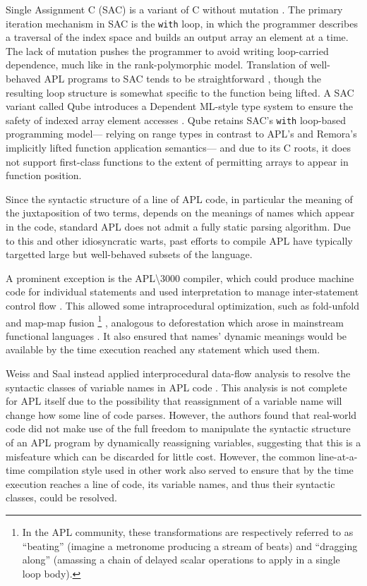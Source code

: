 Single Assignment C (SAC) is a variant of C without mutation \cite{SAC}.
The primary iteration mechanism in SAC is the {\tt with} loop,
in which the programmer describes a traversal of the index space
and builds an output array an element at a time.
The lack of mutation pushes the programmer
to avoid writing loop-carried dependence,
much like in the rank-polymorphic model.
Translation of well-behaved APL programs to SAC
tends to be straightforward \cite{APLSAC},
though the resulting loop structure is
somewhat specific to the function being lifted.
A SAC variant called Qube introduces a Dependent ML-style type system
to ensure the safety of indexed array element accesses \cite{Qube}.
Qube retains SAC's {\tt with} loop-based programming model---%
relying on range types in contrast to
APL's and Remora's implicitly lifted function application semantics---%
and due to its C roots,
it does not support first-class functions
to the extent of permitting arrays to appear in function position.

Since the syntactic structure of a line of APL code,
in particular the meaning of the juxtaposition of two terms,
depends on the meanings of names which appear in the code,
standard APL does not admit a fully static parsing algorithm.
Due to this and other idiosyncratic warts,
past efforts to compile APL have typically targetted
large but well-behaved subsets of the language.

A prominent exception is the APL\textbackslash3000 compiler,
which could produce machine code for individual statements
and used interpretation to manage inter-statement control flow \cite{APL3000Compiler}.
This allowed some intraprocedural optimization,
such as fold-unfold and map-map fusion%
\footnote{In the APL community,
  these transformations are respectively referred to as
``beating'' (imagine a metronome producing a stream of beats)
and ``dragging along'' (amassing a chain of
delayed scalar operations to apply in a single loop body).}
\cite{AbramsAPLMachine},
analogous to deforestation
which arose in mainstream functional languages \cite{BurstallDarlington, WadlerListless}.
It also ensured that names' dynamic meanings would be available
by the time execution reached any statement which used them.

Weiss and Saal instead applied interprocedural data-flow analysis
to resolve the syntactic classes of variable names in APL code \cite{ParsingAPL}.
This analysis is not complete for APL itself
due to the possibility that reassignment of a variable name
will change how some line of code parses.
However, the authors found that
real-world code did not make use of
the full freedom to manipulate
the syntactic structure of an APL program
by dynamically reassigning variables,
suggesting that this is a misfeature which can be discarded for little cost.
However, the common line-at-a-time compilation style
used in other work
also served to ensure that
by the time execution reaches a line of code,
its variable names, and thus their syntactic classes, could be resolved.

